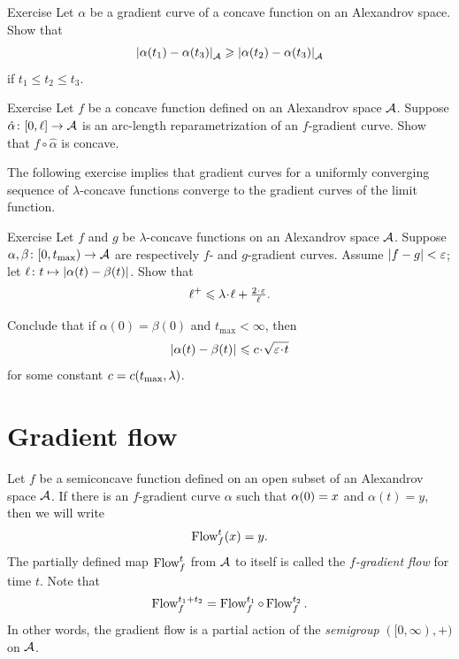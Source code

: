 \begin{thm}{Exercise}\label{ex:elf-contracting}
Let $\alpha$ be a gradient curve of a concave function on an Alexandrov space.
Show that
\[\dist{\alpha(t_1)}{\alpha(t_3)}{\spc{A}}\ge \dist{\alpha(t_2)}{\alpha(t_3)}{\spc{A}}\]
if $t_1\le t_2\le t_3$.
\end{thm}

\begin{thm}{Exercise}\label{ex:mayer}
Let $f$ be a %
concave function defined on an Alexandrov space $\mathcal{A}$.
Suppose $\hat\alpha\colon[0,\ell]\to\mathcal{A}$ is an arc-length reparametrization of an $f$-gradient curve.
Show that $f\circ\hat\alpha$ is concave.
\end{thm}




The following exercise implies that gradient curves for a uniformly converging sequence of $\lambda$-concave functions converge to the gradient curves of the limit function.

\begin{thm}[!]{Exercise}\label{lem:fg-dist-est}
Let $f$ and $g$ be $\lambda$-concave %
 functions on an Alexandrov space $\mathcal{A}$.
Suppose
$\alpha,\beta\colon[0,t_{\max})\to \mathcal{A}$ are respectively $f$- and $g$-gradient curves.
Assume $|f-g|<\varepsilon$; let $\ell\:t\mapsto\dist{\alpha(t)}{\beta(t)}{}$.
Show that
\[\ell^+\le \lambda\cdot\ell+\tfrac{2\cdot\eps}{\ell}.\]

Conclude that if $\alpha(0)=\beta(0)$ and $t_{\max}<\infty$, then
\[\dist{\alpha(t)}{\beta(t)}{}
\le
\Const\cdot\sqrt{\eps\cdot t}\]
for some constant $c=c(t_{\max},\lambda)$.
\end{thm}

\section{Gradient flow}

Let $f$ be a %
semiconcave function defined on an open subset of an Alexandrov space $\mathcal{A}$.
If there is an $f$-gradient curve $\alpha$ such that $\alpha(0)\z=x$ and $\alpha(t)=y$,
then we will write 
\[\mathop{\rm Flow}\nolimits^t_f(x)=y.\]
The partially defined map $\mathop{\rm Flow}\nolimits^t_f$ from $\mathcal{A}$ to itself is called the \emph{$f$-gradient flow} for time $t$.
Note that
\[\mathop{\rm Flow}\nolimits^{t_1+t_2}_f=\mathop{\rm Flow}\nolimits_f^{t_1}\circ\mathop{\rm Flow}\nolimits_f^{t_2}.\]
In other words, the gradient flow is a partial action of the \textit{semigroup} $([0,\infty),+)$ on $\mathcal{A}$.
 
